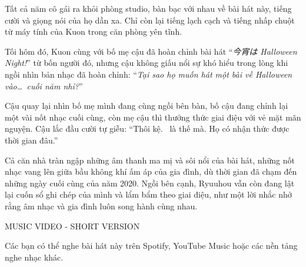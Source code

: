 \documentclass[../main.tex]{subfiles}
\begin{document}
Tất cả năm cô gái ra khỏi phòng studio, bàn bạc với nhau về bài hát này, tiếng cười và giọng nói của họ dần xa. Chỉ còn lại tiếng lạch cạch và tiếng nhấp chuột từ máy tính của Kuon trong căn phòng yên tĩnh.

\ct

Tối hôm đó, Kuon cùng với bố mẹ cậu đã hoàn chỉnh bài hát ``\textit{今宵は Halloween Night!}'' từ bốn người đó, nhưng cậu không giấu nổi sự khó hiểu trong lòng khi ngồi nhìn bản nhạc đã hoàn chỉnh: ``\textit{Tại sao họ muốn hát một bài về Halloween vào\dots\ cuối năm nhỉ?}''

Cậu quay lại nhìn bố mẹ mình đang cùng ngồi bên bàn, bố cậu đang chỉnh lại một vài nốt nhạc cuối cùng, còn mẹ cậu thì thưởng thức giai điệu với vẻ mặt mãn nguyện. Cậu lắc đầu cười tự giễu: ``Thôi kệ. \hll\ là thế mà. Họ có nhận thức được thời gian đâu.''

Cả căn nhà tràn ngập những âm thanh ma mị và sôi nổi của bài hát, những nốt nhạc vang lên giữa bầu không khí ấm áp của gia đình, dù thời gian đã chạm đến những ngày cuối cùng của năm 2020. Ngồi bên cạnh, Ryuuhou vẫn còn đang lật lại cuốn sổ ghi chép của mình và lẩm bẩm theo giai điệu, như một lời nhắc nhở rằng âm nhạc và gia đình luôn song hành cùng nhau.

\begin{center}
  {\ab MUSIC VIDEO - SHORT VERSION}


  Các bạn có thể nghe bài hát này trên Spotify, YouTube Music hoặc các nền tảng nghe nhạc khác.
\end{center}
\end{document}
